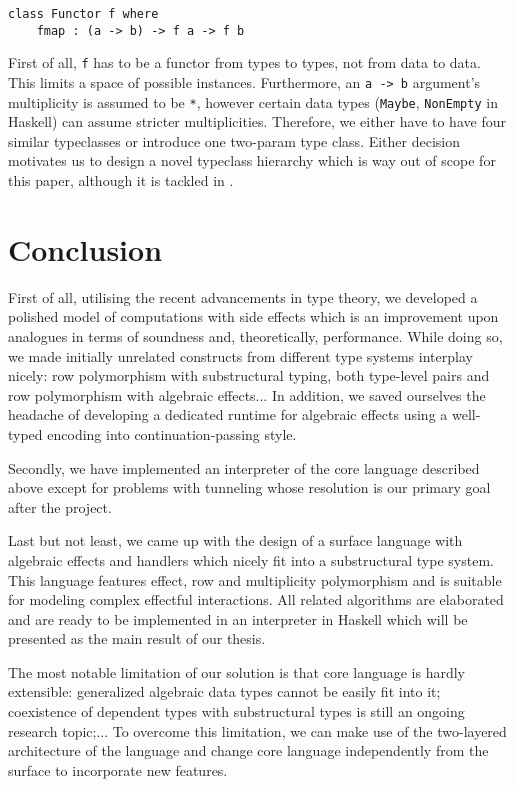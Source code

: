 \documentclass[a4paper,14pt]{extreport}
\begin{document}
\begin{verbatim}
class Functor f where
    fmap : (a -> b) -> f a -> f b
\end{verbatim}

First of all, \verb|f| has to be a functor from types to types, not from data to
data. This limits a space of possible instances. Furthermore, an \verb|a -> b|
argument's multiplicity is assumed to be \verb|*|, however certain data types
(\verb|Maybe|, \verb|NonEmpty| in Haskell) can assume stricter multiplicities.
Therefore, we either have to have four similar typeclasses or introduce one
two-param type class. Either decision motivates us to design a novel typeclass
hierarchy which is way out of scope for this paper, although it is tackled in
\cite{linear-base}.

\chapter{Conclusion}

First of all, utilising the recent advancements in type theory, we developed a
polished model of computations with side effects which is an improvement upon
analogues in terms of soundness and, theoretically, performance. While doing so,
we made initially unrelated constructs from different type systems interplay
nicely: row polymorphism with substructural typing, both type-level pairs and
row polymorphism with algebraic effects... In addition, we saved ourselves the
headache of developing a dedicated runtime for algebraic effects using a
well-typed encoding into continuation-passing style.

Secondly, we have implemented an interpreter of the core language described
above except for problems with tunneling whose resolution is our primary
goal after the project.

Last but not least, we came up with the design of a surface language
with algebraic effects and handlers which nicely fit into a substructural type
system. This language features effect, row and multiplicity polymorphism and is
suitable for modeling complex effectful interactions. All related algorithms are
elaborated and are ready to be implemented in an interpreter in Haskell which
will be presented as the main result of our thesis.

The most notable limitation of our solution is that core language is hardly
extensible: generalized algebraic data types cannot be easily fit into it;
coexistence of dependent types with substructural types is still an ongoing
research topic;... To overcome this limitation, we can make use of the
two-layered architecture of the language and change core language independently
from the surface to incorporate new features.
\end{document}
